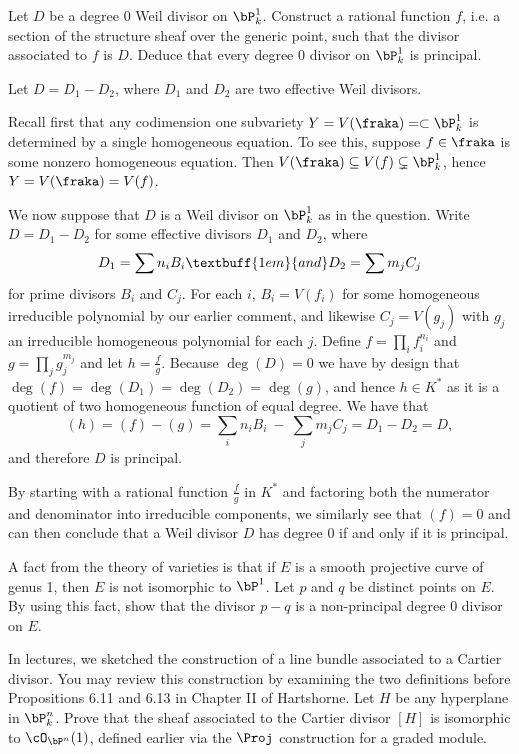 \begin{homework}[e]
    \prob Let $D$ be a degree $0$ Weil divisor on $\bP^{1}_k$. Construct a rational function $f$, i.e. a section of the structure sheaf over the generic point, such that the divisor associated to $f$ is $D$. Deduce that every degree $0$ divisor on $\bP^{1}_k$ is principal.

	\begin{prf}
		Let $D = D_1 - D_2$, where $D_1$ and $D_2$ are two effective Weil divisors.

		Recall first that any codimension one subvariety $Y = V(\fraka) = \subset \bP^{1}_k$ is determined by a single homogeneous equation. To see this, suppose $f \in \fraka$ is some nonzero homogeneous equation. Then $V(\fraka) \subseteq V(f) \subsetneq \bP^{1}_k$, hence $Y = V(\fraka) = V(f)$.

		We now suppose that $D$ is a Weil divisor on $\bP^{1}_k$ as in the question. Write $D = D_1 - D_2$ for some effective divisors $D_1$ and $D_2$, where
		\[
		D_1 = \sum n_i B_i \textbuff{1em}{and} D_2 = \sum m_j C_j
		\]
		for prime divisors $B_i$ and $C_j$. For each $i$, $B_i = V(f_i)$ for some homogeneous irreducible polynomial by our earlier comment, and likewise $C_j = V(g_j)$ with $g_j$ an irreducible homogeneous polynomial for each $j$. Define $f = \prod_i f_i^{n_i}$ and $g = \prod_j g_j^{m_j}$ and let $h= \frac{f}{g}$. Because $\deg(D) = 0$ we have by design that $\deg(f) = \deg(D_1) = \deg(D_2) = \deg(g)$, and hence $h \in K^*$ as it is a quotient of two homogeneous function of equal degree. We have that
		\[
			(h) = (f) - (g) = \sum_i n_i B_i ~-~ \sum_j m_j C_j = D_1 - D_2 = D,
		\]
		and therefore $D$ is principal.

		By starting with a rational function $\frac{f}{g}$ in $K^*$ and factoring both the numerator and denominator into irreducible components, we similarly see that $(f) = 0$ and can then conclude that a Weil divisor $D$ has degree 0 if and only if it is principal.
	\end{prf}

	\prob A fact from the theory of varieties is that if $E$ is a smooth projective curve of genus 1, then $E$ is not isomorphic to $\bP^{1}$. Let $p$ and $q$ be distinct points on $E$. By using this fact, show that the divisor $p-q$ is a non-principal degree 0 divisor on $E$.

	\prob In lectures, we sketched the construction of a line bundle associated to a Cartier divisor. You may review this construction by examining the two definitions before Propositions 6.11 and 6.13 in Chapter II of Hartshorne. Let $H$ be any hyperplane in $\bP^{n}_k$. Prove that the sheaf associated to the Cartier divisor $[H]$ is isomorphic to $\cO_{\bP^n}(1)$, defined earlier via the $\Proj$ construction for a graded module.


\end{homework}
